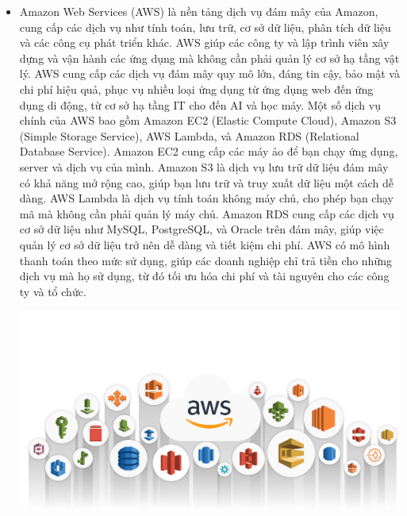 \begin{itemize}
    \item Amazon Web Services (AWS) là nền tảng dịch vụ đám mây của Amazon, cung cấp các dịch vụ như tính toán, lưu trữ, cơ sở dữ liệu, phân tích dữ liệu và các công cụ phát triển khác. AWS giúp các công ty và lập trình viên xây dựng và vận hành các ứng dụng mà không cần phải quản lý cơ sở hạ tầng vật lý. AWS cung cấp các dịch vụ đám mây quy mô lớn, đáng tin cậy, bảo mật và chi phí hiệu quả, phục vụ nhiều loại ứng dụng từ ứng dụng web đến ứng dụng di động, từ cơ sở hạ tầng IT cho đến AI và học máy. Một số dịch vụ chính của AWS bao gồm Amazon EC2 (Elastic Compute Cloud), Amazon S3 (Simple Storage Service), AWS Lambda, và Amazon RDS (Relational Database Service). Amazon EC2 cung cấp các máy ảo để bạn chạy ứng dụng, server và dịch vụ của mình. Amazon S3 là dịch vụ lưu trữ dữ liệu đám mây có khả năng mở rộng cao, giúp bạn lưu trữ và truy xuất dữ liệu một cách dễ dàng. AWS Lambda là dịch vụ tính toán không máy chủ, cho phép bạn chạy mã mà không cần phải quản lý máy chủ. Amazon RDS cung cấp các dịch vụ cơ sở dữ liệu như MySQL, PostgreSQL, và Oracle trên đám mây, giúp việc quản lý cơ sở dữ liệu trở nên dễ dàng và tiết kiệm chi phí. AWS có mô hình thanh toán theo mức sử dụng, giúp các doanh nghiệp chỉ trả tiền cho những dịch vụ mà họ sử dụng, từ đó tối ưu hóa chi phí và tài nguyên cho các công ty và tổ chức.
    
    \includegraphics[width=\textwidth]{imgs/aws.png}
\end{itemize}

